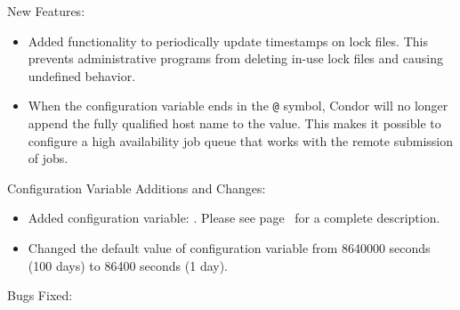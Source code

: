 \noindent New Features:

\begin{itemize}

\item Added functionality to periodically update timestamps on lock files. 
This prevents administrative programs from deleting in-use lock files and
causing undefined behavior.

\item When the configuration variable  ends in 
the \verb$@$ symbol,
Condor will no longer append the fully qualified
host name to the value.
This makes it possible to configure a high availability
job queue that works with the remote submission of jobs.

\end{itemize}

\noindent Configuration Variable Additions and Changes:

\begin{itemize}

\item Added configuration variable: .
Please see page~\pageref{param:LockFileUpdateInterval} for a complete
description.

\item Changed the default value of configuration variable
 from 8640000 seconds (100 days)
to 86400 seconds (1 day).

\end{itemize}

\noindent Bugs Fixed:

